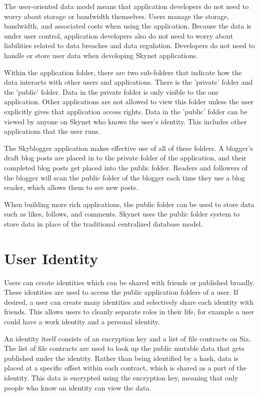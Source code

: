 \documentclass[twocolumn]{article}
\begin{document}
The user-oriented data model means that application developers do not need to
worry about storage or bandwidth themselves. Users manage the storage,
bandwidth, and associated costs when using the application. Because the data is
under user control, application developers also do not need to worry about
liabilities related to data breaches and data regulation. Developers do not need
to handle or store user data when developing Skynet applications.

Within the application folder, there are two sub-folders that indicate how the
data interacts with other users and applications. There is the 'private' folder
and the 'public' folder. Data in the private folder is only visible to the one
application. Other applications are not allowed to view this folder unless the
user explicitly gives that application access rights. Data in the 'public'
folder can be viewed by anyone on Skynet who knows the user's identity. This
includes other applications that the user runs.

The Skyblogger \cite{c-skyblog} application makes effective use of all of these
folders. A blogger's draft blog posts are placed in to the private folder of the
application, and their completed blog posts get placed into the public folder.
Readers and followers of the blogger will scan the public folder of the blogger
each time they use a blog reader, which allows them to see new posts.

When building more rich applications, the public folder can be used to store
data such as likes, follows, and comments. Skynet uses the public folder system
to store data in place of the traditional centralized database model.

\section{User Identity}
Users can create identities which can be shared with friends or published
broadly. These identities are used to access the public application folders of a
user. If desired, a user can create many identities and selectively share each
identity with friends. This allows users to cleanly separate roles in their
life, for example a user could have a work identity and a personal identity.

An identity itself consists of an encryption key and a list of file contracts on
Sia. The list of file contracts are used to look up the public mutable data that
gets published under the identity. Rather than being identified by a hash, data
is placed at a specific offset within each contract, which is shared as a part
of the identity. This data is encrypted using the encryption key, meaning that
only people who know an identity can view the data.
\end{document}
